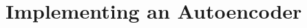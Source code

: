 \documentclass[11pt,a4paper,oneside]{article}
\begin{document}
\section{Implementing an Autoencoder}




\FloatBarrier

\newpage
% 
%  
% 
% 
\end{document}
